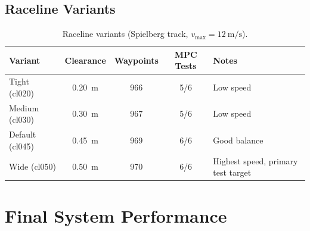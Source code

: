 \documentclass[11pt,a4paper]{article}
\begin{document}
\subsection{Raceline Variants}
\begin{table}[H]
\centering
\caption{Raceline variants (Spielberg track, $v_\text{max} = \SI{12}{\metre\per\second}$).}
\label{tab:raceline_variants}
\begin{tabular}{@{}lcccl@{}}
\toprule
\textbf{Variant} & \textbf{Clearance} & \textbf{Waypoints} & \textbf{MPC Tests} & \textbf{Notes} \\
\midrule
Tight (cl020)        & \SI{0.20}{\metre} & 966 & 5/6 & Low speed \\
Medium (cl030)       & \SI{0.30}{\metre} & 967 & 5/6 & Low speed \\
Default (cl045)      & \SI{0.45}{\metre} & 969 & 6/6 & Good balance \\
Wide (cl050)         & \SI{0.50}{\metre} & 970 & 6/6 & Highest speed, primary test target \\
\bottomrule
\end{tabular}
\end{table}

\section{Final System Performance}
\label{sec:final_performance}
\end{document}
